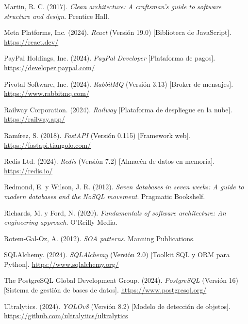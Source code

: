 \begin{list}{}{\setlength{\leftmargin}{1.27cm}\setlength{\itemindent}{-1.27cm}\setlength{\parsep}{0pt}\setlength{\itemsep}{0pt}}
\item Martin, R. C. (2017). \textit{Clean architecture: A craftsman's guide to software structure and design}. Prentice Hall.

\item Meta Platforms, Inc. (2024). \textit{React} (Versión 19.0) [Biblioteca de JavaScript]. \url{https://react.dev/}

\item PayPal Holdings, Inc. (2024). \textit{PayPal Developer} [Plataforma de pagos]. \url{https://developer.paypal.com/}

\item Pivotal Software, Inc. (2024). \textit{RabbitMQ} (Versión 3.13) [Broker de mensajes]. \url{https://www.rabbitmq.com/}

\item Railway Corporation. (2024). \textit{Railway} [Plataforma de despliegue en la nube]. \url{https://railway.app/}

\item Ramírez, S. (2018). \textit{FastAPI} (Versión 0.115) [Framework web]. \url{https://fastapi.tiangolo.com/}

\item Redis Ltd. (2024). \textit{Redis} (Versión 7.2) [Almacén de datos en memoria]. \url{https://redis.io/}

\item Redmond, E. y Wilson, J. R. (2012). \textit{Seven databases in seven weeks: A guide to modern databases and the NoSQL movement}. Pragmatic Bookshelf.

\item Richards, M. y Ford, N. (2020). \textit{Fundamentals of software architecture: An engineering approach}. O'Reilly Media.

\item Rotem-Gal-Oz, A. (2012). \textit{SOA patterns}. Manning Publications.

\item SQLAlchemy. (2024). \textit{SQLAlchemy} (Versión 2.0) [Toolkit SQL y ORM para Python]. \url{https://www.sqlalchemy.org/}

\item The PostgreSQL Global Development Group. (2024). \textit{PostgreSQL} (Versión 16) [Sistema de gestión de bases de datos]. \url{https://www.postgresql.org/}

\item Ultralytics. (2024). \textit{YOLOv8} (Versión 8.2) [Modelo de detección de objetos]. \url{https://github.com/ultralytics/ultralytics}

\end{list}
